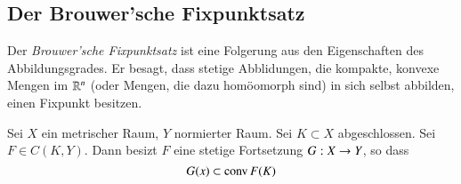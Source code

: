 \subsection{Der Brouwer'sche Fixpunktsatz}

Der \textit{Brouwer'sche Fixpunktsatz} ist eine Folgerung aus den Eigenschaften des Abbildungsgrades.
Er besagt, dass stetige Abblidungen, die kompakte, konvexe Mengen im $\mathbb{R}^n$ (oder Mengen, die dazu
homöomorph sind) in sich selbst abbilden, einen Fixpunkt besitzen.

\begin{theorem}\label{2.12}
    Sei $X$ ein metrischer Raum, $Y$ normierter Raum. Sei $K\subset X$ abgeschlossen. Sei $F\in C(K,Y)$.
    Dann besizt $F$ eine stetige Fortsetzung $G:X\rightarrow Y$, so dass
    \[
        G(x)\subset\mathrm{conv}\, F(K)
    \]
\end{theorem}

